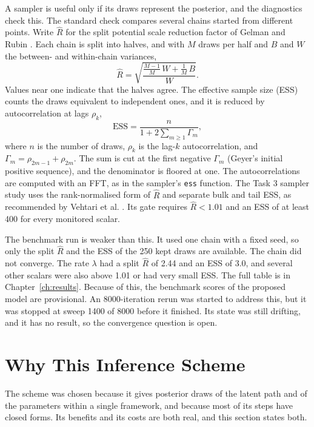 A sampler is useful only if its draws represent the posterior, and the diagnostics check this. The
standard check compares several chains started from different points. Write $\hat R$ for the split
potential scale reduction factor of Gelman and Rubin \cite{gelman1992inference}. Each chain is split
into halves, and with $M$ draws per half and $B$ and $W$ the between- and within-chain variances,
\begin{equation}\label{eq:rhat}
  \hat R = \sqrt{\frac{\frac{M-1}{M}\,W + \frac{1}{M}\,B}{W}}.
\end{equation}
Values near one indicate that the halves agree. The effective sample size (ESS) counts the draws
equivalent to independent ones, and it is reduced by autocorrelation at lags $\rho_k$,
\begin{equation}\label{eq:ess}
  \mathrm{ESS} = \frac{n}{1 + 2\sum_{m \ge 1}\Gamma_m},
\end{equation}
where $n$ is the number of draws, $\rho_k$ is the lag-$k$ autocorrelation, and $\Gamma_m = \rho_{2m-1} + \rho_{2m}$. The sum is cut at the first negative $\Gamma_m$ (Geyer's initial positive sequence), and the denominator is floored at one. The autocorrelations are computed with an FFT, as in the sampler's \texttt{ess} function. The Task 3 sampler study uses the rank-normalised form
of $\hat R$ and separate bulk and tail ESS, as recommended by Vehtari et al. \cite{vehtari2021rank}.
Its gate requires $\hat R < 1.01$ and an ESS of at least 400 for every monitored scalar.

The benchmark run is weaker than this. It used one chain with a fixed seed, so only the split
$\hat R$ and the ESS of the 250 kept draws are available. The chain did not converge. The rate
$\lambda$ had a split $\hat R$ of 2.44 and an ESS of 3.0, and several other scalars were also above
1.01 or had very small ESS. The full table is in Chapter~\ref{ch:results}. Because of this, the
benchmark scores of the proposed model are provisional. An 8000-iteration rerun was started to
address this, but it was stopped at sweep 1400 of 8000 before it finished. Its state was still
drifting, and it has no result, so the convergence question is open.

\section{Why This Inference Scheme}
\label{sec:method-why}

The scheme was chosen because it gives posterior draws of the latent path and of the parameters
within a single framework, and because most of its steps have closed forms. Its benefits and its
costs are both real, and this section states both.

